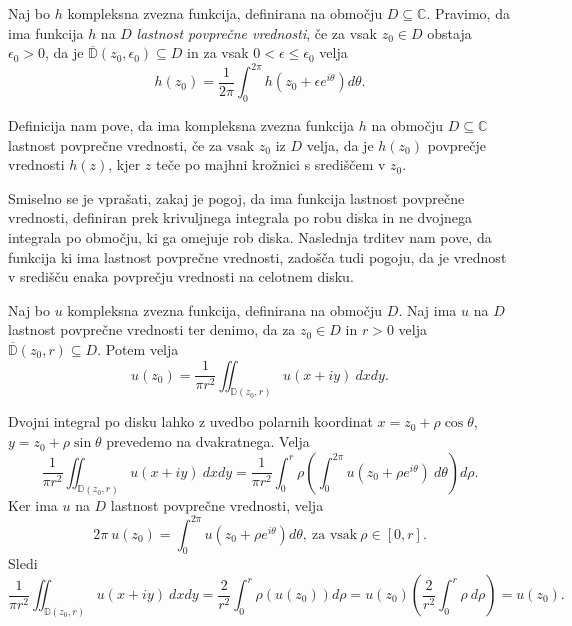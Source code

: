 \documentclass[mat1, tisk]{fmfdelo}
\begin{document}
    \begin{definicija}
        Naj bo $h$ kompleksna zvezna funkcija, definirana na območju $D \subseteq \mathbb{C}$. Pravimo, da ima funkcija $h$ na $D$ \emph{lastnost povprečne vrednosti}, če za vsak $z_0 \in D$ obstaja $\epsilon_0 > 0$, da je $\overline{\mathbb{D}}(z_0, \epsilon_0) \subseteq D$ in za vsak $0 < \epsilon \leq \epsilon_0 $ velja
        $$
            h(z_0) = \frac{1}{2 \pi} \int_{0}^{2 \pi}{h(z_0 + \epsilon e^{i \theta}) d\theta}.
        $$
    \end{definicija}
    \begin{opomba}
        Definicija nam pove, da ima kompleksna zvezna funkcija $h$ na območju $D \subseteq \mathbb{C}$ lastnost povprečne vrednosti, če za vsak $z_0$ iz $D$ velja, 
        da je $h(z_0)$ povprečje vrednosti $h(z)$, kjer $z$ teče po majhni krožnici s središčem v $z_0$.
    \end{opomba}

    Smiselno se je vprašati, zakaj je pogoj, da ima funkcija lastnost povprečne vrednosti, definiran prek krivuljnega integrala po robu diska in ne dvojnega integrala po območju, ki ga omejuje rob diska.
    Naslednja trditev nam pove, da funkcija ki ima lastnost povprečne vrednosti, zadošča tudi pogoju, da je vrednost v središču enaka povprečju vrednosti na celotnem disku.

    \begin{trditev}
        Naj bo $u$ kompleksna zvezna funkcija, definirana na območju $D$. Naj ima $u$ na $D$ lastnost povprečne vrednosti ter denimo, da za $z_0 \in D$ in $r>0$ velja $\overline{\mathbb{D}}(z_0,r) \subseteq D$. Potem velja
        $$
            u(z_0) = \frac{1}{\pi r^2} \iint_{\mathbb{D}(z_0,r)}{u(x + iy)~dxdy}.
        $$
    \end{trditev}
    \begin{dokaz}
        Dvojni integral po disku lahko z uvedbo polarnih koordinat $x = z_0 + \rho \cos\theta$, $y = z_0 + \rho \sin\theta$ prevedemo na dvakratnega. Velja
        $$
        \frac{1}{\pi r^2} \iint_{\mathbb{D}(z_0,r)}{u(x + iy)~dxdy} = \frac{1}{\pi r^2} \int_{0}^{r}{\rho \left(\int_{0}^{2 \pi} u(z_0 + \rho e^{i\theta})~d\theta \right)d\rho}. 
        $$
        Ker ima $u$ na $D$ lastnost povprečne vrednosti, velja
        $$
            2 \pi~u(z_0) = \int_{0}^{2 \pi}{u\left(z_0 + \rho e^{i \theta}\right) d\theta},~\text{za vsak}~\rho \in [0, r].
        $$
        Sledi
        $$
        \frac{1}{\pi r^2} \iint_{\mathbb{D}(z_0,r)}{u(x + iy)~dxdy} = \frac{2}{r^2} \int_{0}^{r}{\rho \left(u(z_0)\right)d\rho} = u(z_0) \left(\frac{2}{r^2} \int_{0}^{r}{\rho~d\rho}\right) = u(z_0).
        $$
    \end{dokaz}
\end{document}

